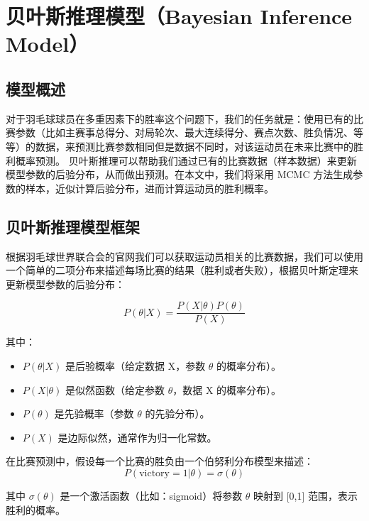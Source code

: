\documentclass[12pt]{article}
\begin{document}
\section{贝叶斯推理模型（Bayesian Inference Model）}

\subsection{模型概述}

对于羽毛球球员在多重因素下的胜率这个问题下，我们的任务就是：使用已有的比赛参数（比如主赛事总得分、对局轮次、最大连续得分、赛点次数、胜负情况、等等）的数据，来预测比赛参数相同但是数据不同时，对该运动员在未来比赛中的胜利概率预测。
贝叶斯推理可以帮助我们通过已有的比赛数据（样本数据）来更新模型参数的后验分布，从而做出预测。在本文中，我们将采用 MCMC 方法生成参数的样本，近似计算后验分布，进而计算运动员的胜利概率。

\subsection{贝叶斯推理模型框架}
根据羽毛球世界联合会的官网我们可以获取运动员相关的比赛数据，我们可以使用一个简单的二项分布来描述每场比赛的结果（胜利或者失败），根据贝叶斯定理来更新模型参数的后验分布：

\begin{equation}P(\theta|X)=\frac{P(X|\theta)P(\theta)}{P(X)}\end{equation}

其中：
\begin{itemize}
	\item $P(\theta|X)$ 是后验概率（给定数据 X，参数 $\theta$ 的概率分布）。
	\item $P(X|\theta)$ 是似然函数（给定参数 $\theta$，数据 X 的概率分布）。
	\item $P(\theta)$ 是先验概率（参数 $\theta$ 的先验分布）。
	\item $P(X)$ 是边际似然，通常作为归一化常数。
	\end{itemize}


在比赛预测中，假设每一个比赛的胜负由一个伯努利分布模型来描述：
\begin{equation}
	P(\mathrm{victory}=1|\theta)=\sigma(\theta)
	\end{equation}

其中 $\sigma(\theta)$ 是一个激活函数（比如：sigmoid）将参数 $\theta$ 映射到 [0,1] 范围，表示胜利的概率。
\end{document}
